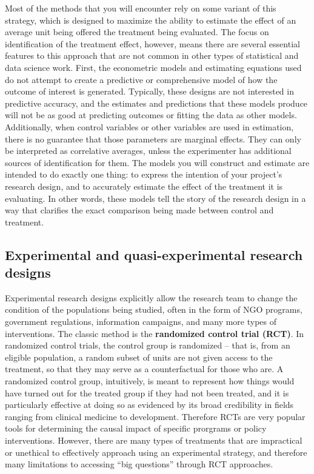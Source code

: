 Most of the methods that you will encounter rely on some variant of this strategy,
which is designed to maximize the ability to estimate the effect
of an average unit being offered the treatment being evaluated.
The focus on identification of the treatment effect, however,
means there are several essential features to this approach
that are not common in other types of statistical and data science work.
First, the econometric models and estimating equations used
do not attempt to create a predictive or comprehensive model
of how the outcome of interest is generated.
Typically, these designs are not interested in predictive accuracy,
and the estimates and predictions that these models produce
will not be as good at predicting outcomes or fitting the data as other models.
Additionally, when control variables or other variables are used in estimation,
there is no guarantee that those parameters are marginal effects.
They can only be interpreted as correlative averages,
unless the experimenter has additional sources of identification for them.
The models you will construct and estimate are intended to do exactly one thing:
to express the intention of your project's research design,
and to accurately estimate the effect of the treatment it is evaluating.
In other words, these models tell the story of the research design
in a way that clarifies the exact comparison being made between control and treatment.

\subsection{Experimental and quasi-experimental research designs}

Experimental research designs explicitly allow the research team
to change the condition of the populations being studied,
often in the form of NGO programs, government regulations,
information campaigns, and many more types of interventions.\cite{banerjee2009experimental}
The classic method is the \textbf{randomized control trial (RCT)}.
In randomized control trials, the control group is randomized --
that is, from an eligible population,
a random subset of units are not given access to the treatment,
so that they may serve as a counterfactual for those who are.
A randomized control group, intuitively, is meant to represent
how things would have turned out for the treated group
if they had not been treated, and it is particularly effective at doing so
as evidenced by its broad credibility in fields ranging from clinical medicine to development.
Therefore RCTs are very popular tools for determining the causal impact
of specific prorgrams or policy interventions.
However, there are many types of treatments that are impractical or unethical
to effectively approach using an experimental strategy,
and therefore many limitations to accessing ``big questions''
through RCT approaches.

